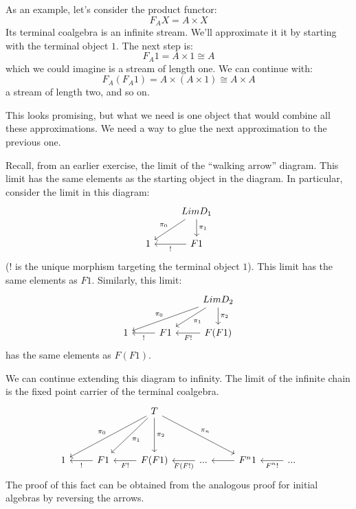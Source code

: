 \documentclass[DaoFP]{subfiles}
\begin{document}
As an example, let's consider the product functor:
\[F_A X = A \times X \]
Its terminal coalgebra is an infinite stream. We'll approximate it it by starting with the terminal object $1$. The next step is:
\[ F_A 1 = A \times 1 \cong A \]
which we could imagine is a stream of length one. We can continue with:
\[ F_A (F_A 1) = A \times (A \times 1) \cong A \times A \]
a stream of length two, and so on. 

This looks promising, but what we need is one object that would combine all these approximations. We need a way to glue the next approximation to the previous one.

Recall, from an earlier exercise, the limit of the ``walking arrow'' diagram. This limit has the same elements as the starting object in the diagram. In particular, consider the limit in this diagram:
\[
 \begin{tikzcd}
 & Lim D_1
 \arrow[dl, "\pi_0"']
\arrow[d, "\pi_1"]
 \\
 1 
 & F1
 \arrow[l, "!"]
 \end{tikzcd}
\]
($!$ is the unique morphism targeting the terminal object $1$). This limit has the same elements as $F 1$. Similarly, this limit:
\[
 \begin{tikzcd}
 && Lim D_2
 \arrow[dll, "\pi_0"']
\arrow[dl, "\pi_1"]
\arrow[d, "\pi_2"]
 \\
 1 
 & F1
 \arrow[l, "!"]
  & F(F 1)
 \arrow[l, "F !"]
\end{tikzcd}
\]
has the same elements as $F(F 1)$.

We can continue extending this diagram to infinity. The limit of the infinite chain is the fixed point carrier of the terminal coalgebra.
\[
 \begin{tikzcd}
  && T
  \arrow[ddll, "\pi_0"']
  \arrow[ddl, "\pi_1"]
  \arrow[dd, "\pi_2"]
  \arrow[ddrr, "\pi_n"]
\\
\\
 1 
 & F 1
 \arrow[l, "!"]
 & F (F 1)
 \arrow[l, "F !"]
 & ...
 \arrow[l, "F(F !)"]
 & F^n 1
  \arrow[l]
 & ...
  \arrow[l, "F^n !"]
 \end{tikzcd}
\]
The proof of this fact can be obtained from the analogous proof for initial algebras by reversing the arrows.
\end{document}
